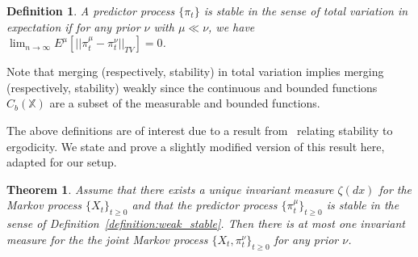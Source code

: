 \documentclass[conference]{IEEEtran}
\newtheorem{theorem}{Theorem}[section]
\newtheorem{definition}{Definition}[section]
\begin{document}
\begin{definition}\label{definition:TV_stable}
    A predictor process \(\{\pi_t\}\) is stable in the sense of total variation in expectation if for any prior \( \nu \) with \( \mu \ll \nu \), we have \( \lim_{n \to \infty}E^\mu [||\pi_t^\mu - \pi_t^\nu||_{TV}] = 0 \).
\end{definition}

Note that merging (respectively, stability) in total variation implies merging (respectively, stability) weakly since the continuous and bounded functions \( C_b(\mathbb{X}) \) are a subset of the measurable and bounded functions.

The above definitions are of interest due to a result from~\cite[Theorem 2]{Stettner} relating stability to ergodicity. We state and prove a slightly modified version of this result here, adapted for our setup.

\begin{theorem}\label{theorem:unique}
    Assume that there exists a unique invariant measure \( \zeta(dx) \) for the Markov process \( \{X_t\}_{t\ge0} \) and that the predictor process \( \{\pi_t^\mu \}_{t\ge0} \) is stable in the sense of Definition~\ref{definition:weak_stable}. Then there is at most one invariant measure for the the joint Markov process \( \{X_t,\pi_t^\nu \}_{t\ge0} \) for any prior \( \nu \).
\end{theorem}
\end{document}
